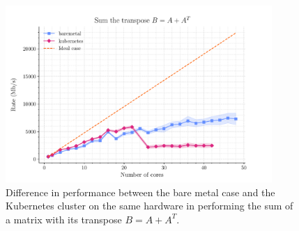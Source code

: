 \begin{figure}
  \centering
  \includegraphics[width=0.9\textwidth]{img/chpt4/array-sum-the-transpose}
  \caption{Difference in performance between the bare metal case and the
    Kubernetes cluster on the same hardware in performing the sum of a matrix
    with its transpose $B=A+A^T$.}
  \label{fig:array-sum-transposed-matrix}
\end{figure}




